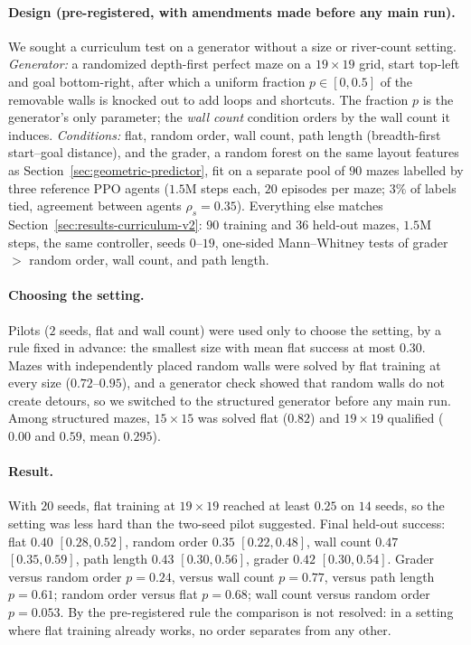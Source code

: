 \documentclass[twoside]{article}
\begin{document}
\paragraph{Design (pre-registered, with amendments made before any main run).} We sought a curriculum test on a generator without a size or river-count setting. \emph{Generator:} a randomized depth-first perfect maze on a $19\times19$ grid, start top-left and goal bottom-right, after which a uniform fraction $p\in[0,0.5]$ of the removable walls is knocked out to add loops and shortcuts. The fraction $p$ is the generator's only parameter; the \emph{wall count} condition orders by the wall count it induces. \emph{Conditions:} flat, random order, wall count, path length (breadth-first start--goal distance), and the grader, a random forest on the same layout features as Section~\ref{sec:geometric-predictor}, fit on a separate pool of $90$ mazes labelled by three reference PPO agents ($1.5$M steps each, $20$ episodes per maze; $3\%$ of labels tied, agreement between agents $\rho_s=0.35$). Everything else matches Section~\ref{sec:results-curriculum-v2}: $90$ training and $36$ held-out mazes, $1.5$M steps, the same controller, seeds $0$--$19$, one-sided Mann--Whitney tests of grader $>$ random order, wall count, and path length.

\paragraph{Choosing the setting.} Pilots ($2$ seeds, flat and wall count) were used only to choose the setting, by a rule fixed in advance: the smallest size with mean flat success at most $0.30$. Mazes with independently placed random walls were solved by flat training at every size ($0.72$--$0.95$), and a generator check showed that random walls do not create detours, so we switched to the structured generator before any main run. Among structured mazes, $15\times15$ was solved flat ($0.82$) and $19\times19$ qualified ($0.00$ and $0.59$, mean $0.295$).

\paragraph{Result.} With $20$ seeds, flat training at $19\times19$ reached at least $0.25$ on $14$ seeds, so the setting was less hard than the two-seed pilot suggested. Final held-out success: flat $0.40$ $[0.28, 0.52]$, random order $0.35$ $[0.22, 0.48]$, wall count $0.47$ $[0.35, 0.59]$, path length $0.43$ $[0.30, 0.56]$, grader $0.42$ $[0.30, 0.54]$. Grader versus random order $p=0.24$, versus wall count $p=0.77$, versus path length $p=0.61$; random order versus flat $p=0.68$; wall count versus random order $p=0.053$. By the pre-registered rule the comparison is not resolved: in a setting where flat training already works, no order separates from any other.
\end{document}
